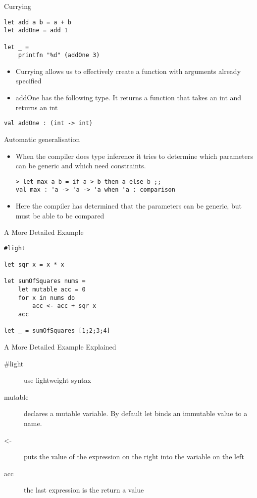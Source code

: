 \documentclass[landscape]{slides}
\begin{document}
\begin{slide}{Currying}
\begin{verbatim}
let add a b = a + b
let addOne = add 1

let _ =
    printfn "%d" (addOne 3)
\end{verbatim}
\begin{itemize}
\item Currying allows us to effectively create a function with arguments already specified
\item addOne has the following type. It returns a function that takes an int and returns an int
\end{itemize}
\begin{verbatim}
val addOne : (int -> int)
\end{verbatim}
\end{slide}

\begin{slide}{Automatic generalisation}
\begin{itemize}
\item When the compiler does type inference it tries to determine which parameters can be generic and which need constraints.
\begin{verbatim}
> let max a b = if a > b then a else b ;;
val max : 'a -> 'a -> 'a when 'a : comparison
\end{verbatim}
\item Here the compiler has determined that the parameters can be generic, but must be able to be compared
\end{itemize}
\end{slide}

\begin{slide}{A More Detailed Example}
\begin{verbatim}
#light

let sqr x = x * x

let sumOfSquares nums =
    let mutable acc = 0
    for x in nums do
        acc <- acc + sqr x
    acc

let _ = sumOfSquares [1;2;3;4]
\end{verbatim}
\end{slide}

\begin{slide}{A More Detailed Example Explained}
\begin{description}
\item[\#light] use lightweight syntax
\item[mutable] declares a mutable variable. By default let binds an immutable value to a name.
\item[\textless-] puts the value of the expression on the right into the variable on the left
\item[acc] the last expression is the return a value
\end{description}
\end{slide}
\end{document}
